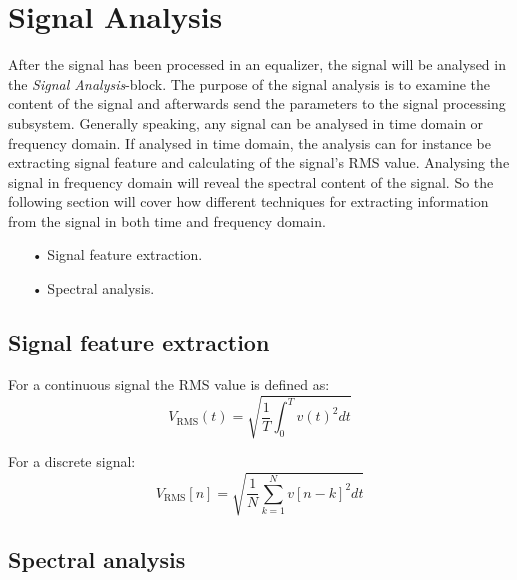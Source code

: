 \section{Signal Analysis}

After the signal has been processed in an equalizer, the signal will be analysed in the \textit{Signal Analysis}-block. The purpose of the signal analysis is to examine the content of the signal and afterwards send the parameters to the signal processing subsystem. Generally speaking, any signal can be analysed in time domain or frequency domain. If analysed in time domain, the analysis can for instance be extracting signal feature and calculating of the signal's RMS value. Analysing the signal in frequency domain will reveal the spectral content of the signal. So the following section will cover how different techniques for extracting information from the signal in both time and frequency domain.

\begin{itemize}
\item[•] Signal feature extraction.
\item[•] Spectral analysis.
\end{itemize}

\subsection{Signal feature extraction}

For a continuous signal the RMS value is defined as:
\begin{equation}
V_{\text{RMS}}(t) = \sqrt{\frac{1}{T}\int_0^T v(t)^2 dt}
\end{equation}

For a discrete signal:
\begin{equation}
V_{\text{RMS}}[n] = \sqrt{\frac{1}{N}\sum_{k=1}^{N} v[n-k]^2 dt}
\end{equation}


\subsection{Spectral analysis}

























